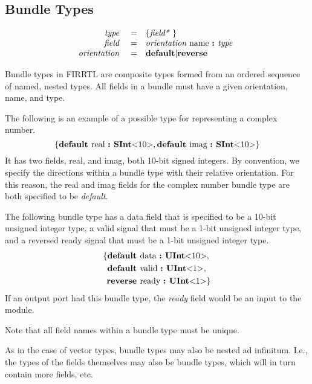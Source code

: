 \documentclass[12pt]{article}
\begin{document}
\subsection{Bundle Types}
\[
\begin{array}{rrl}
\text{\em type\ }       &=     &\{\text{\em field*\ }\}                         \\
\text{\em field\ }      &=     &\text{\em orientation\ } \text{name } \text{\bf :\ } \text{\em type\ }        \\
\text{\em orientation\ }&=     &\text{\bf default} \vert \text{\bf reverse}    \\ 
\end{array}
\]

Bundle types in FIRRTL are composite types formed from an ordered sequence of named, nested types.
All fields in a bundle must have a given orientation, name, and type.

The following is an example of a possible type for representing a complex number.
\[
\{\text{\bf default\ } \text{real } \text{\bf :\ } \text{\bf SInt}\text{\bf $<$} 10 \text{\bf $>$},
         \text{\bf default\ } \text{imag } \text{\bf :\ } \text{\bf SInt}\text{\bf $<$} 10 \text{\bf $>$}\}
\]
It has two fields, real, and imag, both 10-bit signed integers.
By convention, we specify the directions within a bundle type with their relative orientation.
For this reason, the real and imag fields for the complex number bundle type are both specified to be {\em default}.

The following bundle type has a data field that is specified to be a 10-bit unsigned integer type, a valid signal that must be a 1-bit unsigned integer type, and a reversed ready signal that must be a 1-bit unsigned integer type.
\[
\begin{aligned}
\{ \text{\bf default\ } &\text{data } \text{\bf :\ } \text{\bf UInt}\text{\bf $<$} 10 \text{\bf $>$}, \\
   \text{\bf default\ } &\text{valid } \text{\bf :\ } \text{\bf UInt}\text{\bf $<$} 1 \text{\bf $>$}, \\
   \text{\bf reverse\ } &\text{ready } \text{\bf :\ } \text{\bf UInt}\text{\bf $<$} 1 \text{\bf $>$}\} \\
\end{aligned}
\]
If an output port had this bundle type, the {\em ready} field would be an input to the module.

Note that all field names within a bundle type must be unique.

As in the case of vector types, bundle types may also be nested ad infinitum.
I.e., the types of the fields themselves may also be bundle types, which will in turn contain more fields, etc. 
\end{document}
